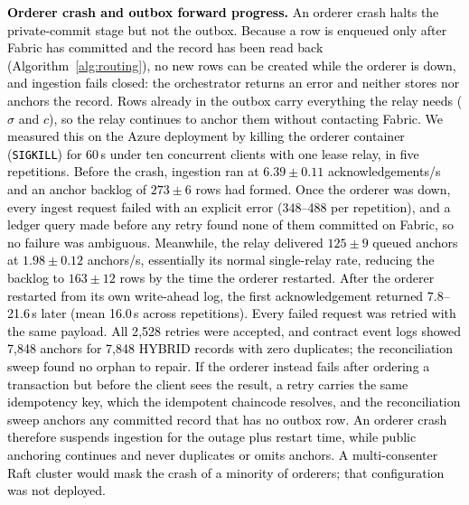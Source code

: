 \documentclass[final,5p,times,twocolumn]{elsarticle}
\begin{document}
\textcolor{black}{\textbf{Orderer crash and outbox forward progress.} An orderer crash halts the private-commit stage but not the outbox. Because a row is enqueued only after Fabric has committed and the record has been read back (Algorithm~\ref{alg:routing}), no new rows can be created while the orderer is down, and ingestion fails closed: the orchestrator returns an error and neither stores nor anchors the record. Rows already in the outbox carry everything the relay needs ($\sigma$ and $c$), so the relay continues to anchor them without contacting Fabric. We measured this on the Azure deployment by killing the orderer container (\texttt{SIGKILL}) for 60\,s under ten concurrent clients with one lease relay, in five repetitions. Before the crash, ingestion ran at $6.39\pm0.11$ acknowledgements/s and an anchor backlog of $273\pm6$ rows had formed. Once the orderer was down, every ingest request failed with an explicit error (348--488 per repetition), and a ledger query made before any retry found none of them committed on Fabric, so no failure was ambiguous. Meanwhile, the relay delivered $125\pm9$ queued anchors at $1.98\pm0.12$ anchors/s, essentially its normal single-relay rate, reducing the backlog to $163\pm12$ rows by the time the orderer restarted. After the orderer restarted from its own write-ahead log, the first acknowledgement returned 7.8--21.6\,s later (mean 16.0\,s across repetitions). Every failed request was retried with the same payload. All 2{,}528 retries were accepted, and contract event logs showed 7{,}848 anchors for 7{,}848 HYBRID records with zero duplicates; the reconciliation sweep found no orphan to repair. If the orderer instead fails after ordering a transaction but before the client sees the result, a retry carries the same idempotency key, which the idempotent chaincode resolves, and the reconciliation sweep anchors any committed record that has no outbox row. An orderer crash therefore suspends ingestion for the outage plus restart time, while public anchoring continues and never duplicates or omits anchors. A multi-consenter Raft cluster would mask the crash of a minority of orderers; that configuration was not deployed.}

\iffalse
\end{document}
